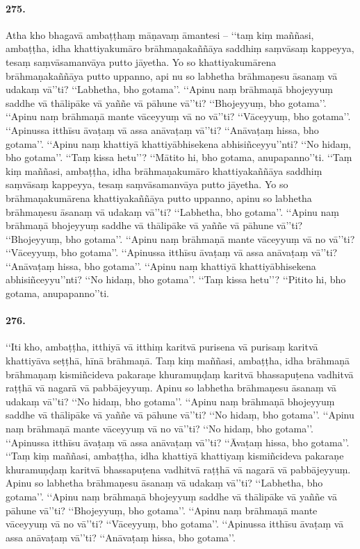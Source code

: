\paragraph{275.} Atha kho bhagavā ambaṭṭhaṃ māṇavaṃ āmantesi – ‘‘taṃ kiṃ maññasi, ambaṭṭha, idha khattiyakumāro brāhmaṇakaññāya saddhiṃ saṃvāsaṃ kappeyya, tesaṃ saṃvāsamanvāya putto jāyetha. Yo so khattiyakumārena brāhmaṇakaññāya putto uppanno, api nu so labhetha brāhmaṇesu āsanaṃ vā udakaṃ vā’’ti? ‘‘Labhetha, bho gotama’’. ‘‘Apinu naṃ brāhmaṇā bhojeyyuṃ saddhe vā thālipāke vā yaññe vā pāhune vā’’ti? ‘‘Bhojeyyuṃ, bho gotama’’. ‘‘Apinu naṃ brāhmaṇā mante vāceyyuṃ vā no vā’’ti? ‘‘Vāceyyuṃ, bho gotama’’. ‘‘Apinussa itthīsu āvaṭaṃ vā assa anāvaṭaṃ vā’’ti? ‘‘Anāvaṭaṃ hissa, bho gotama’’. ‘‘Apinu naṃ khattiyā khattiyābhisekena abhisiñceyyu’’nti? ‘‘No hidaṃ, bho gotama’’. ‘‘Taṃ kissa hetu’’? ‘‘Mātito hi, bho gotama, anupapanno’’ti. ‘‘Taṃ kiṃ maññasi, ambaṭṭha, idha brāhmaṇakumāro khattiyakaññāya saddhiṃ saṃvāsaṃ kappeyya, tesaṃ saṃvāsamanvāya putto jāyetha. Yo so brāhmaṇakumārena khattiyakaññāya putto uppanno, apinu so labhetha brāhmaṇesu āsanaṃ vā udakaṃ vā’’ti? ‘‘Labhetha, bho gotama’’. ‘‘Apinu naṃ brāhmaṇā bhojeyyuṃ saddhe vā thālipāke vā yaññe vā pāhune vā’’ti? ‘‘Bhojeyyuṃ, bho gotama’’. ‘‘Apinu naṃ brāhmaṇā mante vāceyyuṃ vā no vā’’ti? ‘‘Vāceyyuṃ, bho gotama’’. ‘‘Apinussa itthīsu āvaṭaṃ vā assa anāvaṭaṃ vā’’ti? ‘‘Anāvaṭaṃ hissa, bho gotama’’. ‘‘Apinu naṃ khattiyā khattiyābhisekena abhisiñceyyu’’nti? ‘‘No hidaṃ, bho gotama’’. ‘‘Taṃ kissa hetu’’? ‘‘Pitito hi, bho gotama, anupapanno’’ti.

\paragraph{276.} ‘‘Iti kho, ambaṭṭha, itthiyā vā itthiṃ karitvā purisena vā purisaṃ karitvā khattiyāva seṭṭhā, hīnā brāhmaṇā. Taṃ kiṃ maññasi, ambaṭṭha, idha brāhmaṇā brāhmaṇaṃ kismiñcideva pakaraṇe khuramuṇḍaṃ karitvā bhassapuṭena vadhitvā raṭṭhā vā nagarā vā pabbājeyyuṃ. Apinu so labhetha brāhmaṇesu āsanaṃ vā udakaṃ vā’’ti? ‘‘No hidaṃ, bho gotama’’. ‘‘Apinu naṃ brāhmaṇā bhojeyyuṃ saddhe vā thālipāke vā yaññe vā pāhune vā’’ti? ‘‘No hidaṃ, bho gotama’’. ‘‘Apinu naṃ brāhmaṇā mante vāceyyuṃ vā no vā’’ti? ‘‘No hidaṃ, bho gotama’’. ‘‘Apinussa itthīsu āvaṭaṃ vā assa anāvaṭaṃ vā’’ti? ‘‘Āvaṭaṃ hissa, bho gotama’’. ‘‘Taṃ kiṃ maññasi, ambaṭṭha, idha khattiyā khattiyaṃ kismiñcideva pakaraṇe khuramuṇḍaṃ karitvā bhassapuṭena vadhitvā raṭṭhā vā nagarā vā pabbājeyyuṃ. Apinu so labhetha brāhmaṇesu āsanaṃ vā udakaṃ vā’’ti? ‘‘Labhetha, bho gotama’’. ‘‘Apinu naṃ brāhmaṇā bhojeyyuṃ saddhe vā thālipāke vā yaññe vā pāhune vā’’ti? ‘‘Bhojeyyuṃ, bho gotama’’. ‘‘Apinu naṃ brāhmaṇā mante vāceyyuṃ vā no vā’’ti? ‘‘Vāceyyuṃ, bho gotama’’. ‘‘Apinussa itthīsu āvaṭaṃ vā assa anāvaṭaṃ vā’’ti? ‘‘Anāvaṭaṃ hissa, bho gotama’’.

